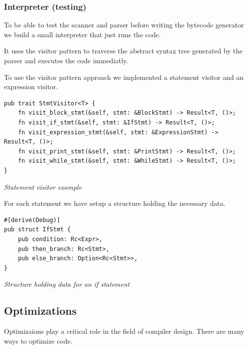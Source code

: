 \documentclass{article}
\begin{document}
\subsubsection{Interpreter (testing)}
To be able to test the scanner and parser before writing the bytecode generator
we build a small interpreter that just runs the code.

It uses the visitor pattern to traverse the abstract syntax tree generated by
the parser and executes the code immediatly.

To use the visitor pattern approach we implemented a statement visitor and an
expression visitor.

\begin{verbatim}
pub trait StmtVisitor<T> {
    fn visit_block_stmt(&self, stmt: &BlockStmt) -> Result<T, ()>;
    fn visit_if_stmt(&self, stmt: &IfStmt) -> Result<T, ()>;
    fn visit_expression_stmt(&self, stmt: &ExpressionStmt) -> Result<T, ()>;
    fn visit_print_stmt(&self, stmt: &PrintStmt) -> Result<T, ()>;
    fn visit_while_stmt(&self, stmt: &WhileStmt) -> Result<T, ()>;
}
\end{verbatim}
\textit{Statement visitor example}

For each statement we have setup a structure holding the necessary data.

\begin{verbatim}
#[derive(Debug)]
pub struct IfStmt {
    pub condition: Rc<Expr>,
    pub then_branch: Rc<Stmt>,
    pub else_branch: Option<Rc<Stmt>>,
}
\end{verbatim}
\textit{Structure holding data for an if statement}


\subsection{Optimizations} %
Optimizaions play a critical role in the field of compiler design. There are many
ways to optimize code.
\end{document}
